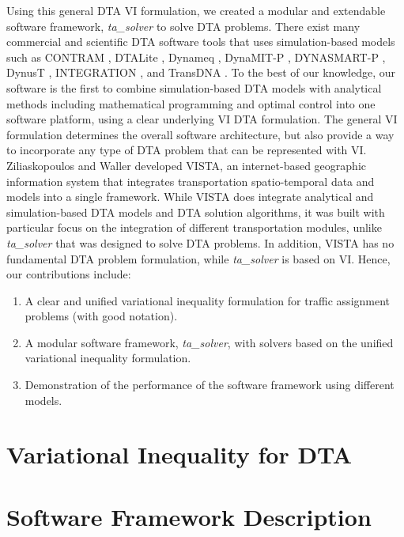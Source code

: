 \documentclass[conference]{IEEEtran}
\renewcommand{\:}{\mathrel{\coloneqq}}
\renewcommand{\=}{\ensuremath{\eqqcolon}}
\newcommand{\0}{\ensuremath{\boldsymbol{0}}}
\begin{document}
Using this general DTA VI formulation, we created a modular and extendable software framework, \textit{ta\_solver} to solve DTA problems. There exist many commercial and scientific DTA software tools that uses simulation-based models such as CONTRAM \cite{taylor2003contram}, DTALite \cite{zhou2014dtalite}, Dynameq \cite{mahut2010traffic}, DynaMIT-P \cite{DynaMIT,ben2001dynamit}, DYNASMART-P \cite{DYNASMART,mahmassani2004dynasmart}, DynusT \cite{chiu2011dynust}, INTEGRATION \cite{rakha2012integration}, and TransDNA \cite{TransDNA}. To the best of our knowledge, our software is the first
to combine simulation-based DTA models with analytical methods including mathematical programming and optimal control into one software platform, using a clear underlying VI DTA formulation. The general VI formulation determines the overall software architecture, but also provide a way to incorporate any type of DTA problem that can be represented with VI. Ziliaskopoulos and Waller developed VISTA,
an internet-based geographic information system that integrates transportation spatio-temporal data and models into a single framework. While VISTA does integrate analytical and simulation-based DTA models and DTA solution algorithms, it was built with particular focus on the integration of different transportation modules, unlike \textit{ta\_solver} that was designed to solve DTA problems. In addition, VISTA has no fundamental DTA problem formulation, while \textit{ta\_solver} is based on VI. 
Hence, our contributions include:
\begin{enumerate}
    \item A clear and unified variational inequality formulation for traffic assignment problems (with good notation).
    \item A modular software framework, \textit{ta\_solver},  with solvers based on the unified variational inequality formulation.
    \item Demonstration of the performance of the software framework using different models.
\end{enumerate}

\section{Variational Inequality for DTA}

\section{Software Framework Description}
\end{document}

